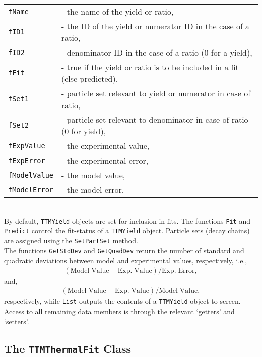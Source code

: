 \documentclass{elsarticle}
\begin{document}
\begin{tabular}{ll}
\texttt{fName} &- the name of the yield or ratio,\\
\texttt{fID1} &- the ID of the yield or numerator ID in the case of a ratio,\\
\texttt{fID2} &- denominator ID in the case of a ratio (0 for a yield),\\
\texttt{fFit} &- true if the yield or ratio is to be included in a fit (else predicted),\\
\texttt{fSet1} &- particle set relevant to yield or numerator in case of ratio,\\
\texttt{fSet2} &- particle set relevant to denominator in case of ratio (0 for yield),\\
\texttt{fExpValue} &- the experimental value,\\
\texttt{fExpError} &- the experimental error,\\
\texttt{fModelValue} &- the model value,\\
\texttt{fModelError} &- the model error.\\
\end{tabular}\\

By default, \texttt{TTMYield} objects are set for inclusion in fits. The 
functions \texttt{Fit} and \texttt{Predict} 
control the fit-status of a \texttt{TTMYield} object. Particle sets (decay chains) are assigned using the \texttt{SetPartSet} method.\\ 

The functions \texttt{GetStdDev} and \texttt{GetQuadDev} return the number 
of standard and quadratic deviations between model and experimental values, 
respectively, i.e., 
\begin{eqnarray}
(\mathrm{Model\;Value- Exp.\;Value})/\mathrm{Exp.\;Error},
\end{eqnarray}
and, 
\begin{eqnarray}
(\mathrm{Model\;Value - Exp.\;Value})/\mathrm{Model\;Value},
\end{eqnarray}
respectively, while \texttt{List} outputs the contents of a \texttt{TTMYield} 
object to screen. Access to all remaining data members is through the relevant `getters' and `setters'. \\ 

\subsection{The \texttt{TTMThermalFit} Class}
\end{document}
